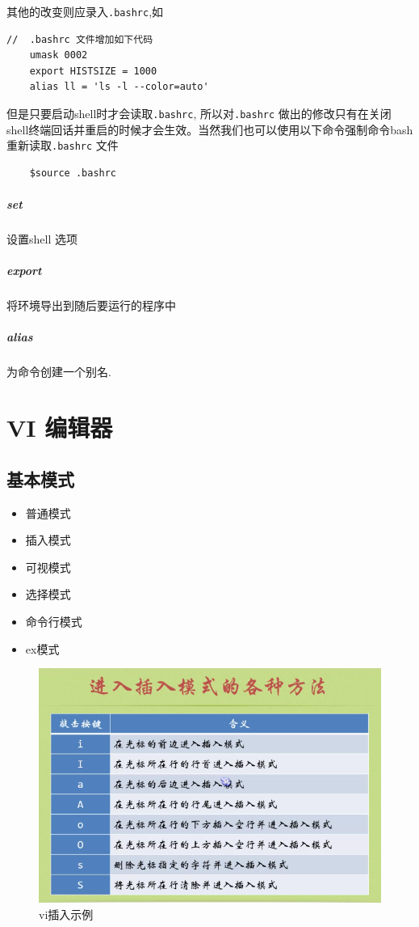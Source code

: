 \documentclass[UTF8,a4paper,12pt]{ctexbook}
\begin{document}
			其他的改变则应录入\verb|.bashrc|,如
			\begin{lstlisting}
//  .bashrc 文件增加如下代码
	umask 0002
	export HISTSIZE = 1000
	alias ll = 'ls -l --color=auto'
			\end{lstlisting}
			
			但是只要启动shell时才会读取\verb|.bashrc|, 所以对\verb|.bashrc| 做出的修改只有在关闭shell终端回话并重启的时候才会生效。当然我们也可以使用以下命令强制命令bash 重新读取\verb|.bashrc| 文件
			
			\begin{lstlisting}
	$source .bashrc
			\end{lstlisting}
		\subparagraph{set}设置shell 选项
		\subparagraph{export}将环境导出到随后要运行的程序中
		\subparagraph{alias}为命令创建一个别名.
		
	\section{VI 编辑器}
		\subsection{基本模式}
			\begin{itemize}
				\item 普通模式
				\item 插入模式
				\item 可视模式
				\item 选择模式
				\item 命令行模式
				\item ex模式
			\end{itemize}
			\begin{figure}[h]
				\centering
				\includegraphics[scale = 0.5]{figure/viInsert.png}
				\caption{vi插入示例}
			\end{figure}
\end{document}
